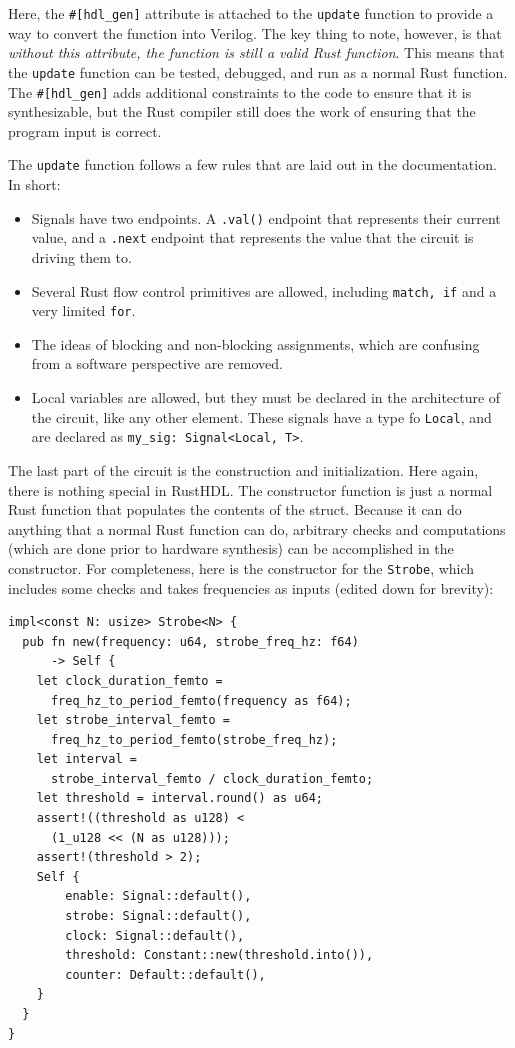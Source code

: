 \documentclass[conference]{IEEEtran}
\begin{document}
Here, the \verb|#[hdl_gen]| attribute is attached to the \verb|update| function to provide a way to convert the function
into Verilog.  The key thing to note, however, is that \emph{without this attribute, the function is still a valid Rust function}.
This means that the \verb|update| function can be tested, debugged, and run as a normal Rust function.  The \verb|#[hdl_gen]| adds
additional constraints to the code to ensure that it is synthesizable, but the Rust compiler still does the work of ensuring that the 
program input is correct.

The \verb|update| function follows a few rules that are laid out in the documentation.  In short:
\begin{itemize}
  \item Signals have two endpoints.  A \verb|.val()| endpoint that represents their current value, and a \verb|.next| endpoint that represents
    the value that the circuit is driving them to.
  \item Several Rust flow control primitives are allowed, including \verb|match, if| and a very limited \verb|for|.  
  \item The ideas of blocking and non-blocking assignments, which are confusing from a software perspective are removed.  
  \item Local variables are allowed, but they must be declared in the architecture of the circuit, like any other element.
  These signals have a type fo \verb|Local|, and are declared as \verb|my_sig: Signal<Local, T>|.
\end{itemize}

The last part of the circuit is the construction and initialization.  Here again, there is nothing special in RustHDL.  The 
constructor function is just a normal Rust function that populates the contents of the struct.  Because it can do anything
that a normal Rust function can do, arbitrary checks and computations (which are done prior to hardware synthesis) can be 
accomplished in the constructor.  For completeness, here is the constructor for the \verb|Strobe|, which includes some checks 
and takes frequencies as inputs (edited down for brevity):

\begin{verbatim}
impl<const N: usize> Strobe<N> {
  pub fn new(frequency: u64, strobe_freq_hz: f64)
      -> Self {
    let clock_duration_femto = 
      freq_hz_to_period_femto(frequency as f64);
    let strobe_interval_femto = 
      freq_hz_to_period_femto(strobe_freq_hz);
    let interval = 
      strobe_interval_femto / clock_duration_femto;
    let threshold = interval.round() as u64;
    assert!((threshold as u128) < 
      (1_u128 << (N as u128)));
    assert!(threshold > 2);
    Self {
        enable: Signal::default(),
        strobe: Signal::default(),
        clock: Signal::default(),
        threshold: Constant::new(threshold.into()),
        counter: Default::default(),
    }
  }
}
\end{verbatim}
\end{document}
